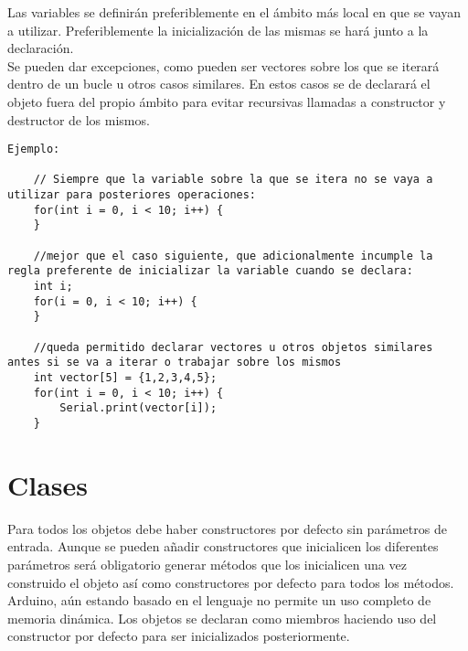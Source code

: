 
    Las variables se definirán preferiblemente en el ámbito más local en que se vayan a utilizar. Preferiblemente la inicialización de las mismas se hará junto a la declaración.
    \\ 
    
    Se pueden dar excepciones, como pueden ser vectores sobre los que se iterará dentro de un bucle u otros casos similares. En estos casos se de declarará el objeto fuera del propio ámbito para evitar recursivas llamadas a constructor y destructor de los mismos.
    \\ 
    
    \lstset{language=C, breaklines=true, basicstyle=\footnotesize}
    \begin{lstlisting}[frame=single]
Ejemplo: 
    
    // Siempre que la variable sobre la que se itera no se vaya a utilizar para posteriores operaciones: 
    for(int i = 0, i < 10; i++) {
    }
    
    //mejor que el caso siguiente, que adicionalmente incumple la regla preferente de inicializar la variable cuando se declara:
    int i; 
    for(i = 0, i < 10; i++) {
    }
    
    //queda permitido declarar vectores u otros objetos similares antes si se va a iterar o trabajar sobre los mismos
    int vector[5] = {1,2,3,4,5};
    for(int i = 0, i < 10; i++) {
        Serial.print(vector[i]);
    }

    \end{lstlisting}
    
\section{Clases}\label{sec:codificacionSW:clases}


Para todos los objetos debe haber constructores por defecto sin parámetros de entrada. Aunque se pueden añadir constructores que inicialicen los diferentes parámetros será obligatorio generar métodos que los inicialicen una vez construido el objeto así como constructores por defecto para todos los métodos. Arduino, aún estando basado en el lenguaje  no permite un uso completo de memoria dinámica. Los objetos se declaran como miembros haciendo uso del constructor por defecto para ser inicializados posteriormente.
\\ 

